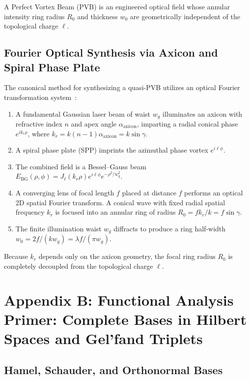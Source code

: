 \documentclass{optica-article}
\begin{document}
A Perfect Vortex Beam (PVB) is an engineered optical field whose annular intensity ring radius $R_0$ and thickness $w_0$ are geometrically independent of the topological charge $\ell$.

\subsection{Fourier Optical Synthesis via Axicon and Spiral Phase Plate}

The canonical method for synthesizing a quasi-PVB utilizes an optical Fourier transformation system~\cite{Vaity2015}:
\begin{enumerate}
    \item A fundamental Gaussian laser beam of waist $w_g$ illuminates an axicon with refractive index $n$ and apex angle $\alpha_{\text{axicon}}$, imparting a radial conical phase $e^{i k_r \rho}$, where $k_r = k (n-1) \alpha_{\text{axicon}} = k \sin \gamma$.
    \item A spiral phase plate (SPP) imprints the azimuthal phase vortex $e^{i \ell \phi}$.
    \item The combined field is a Bessel--Gauss beam $E_{\text{BG}}(\rho, \phi) = J_\ell(k_r \rho) e^{i \ell \phi} e^{-\rho^2 / w_g^2}$.
    \item A converging lens of focal length $f$ placed at distance $f$ performs an optical 2D spatial Fourier transform. A conical wave with fixed radial spatial frequency $k_r$ is focused into an annular ring of radius $R_0 = f k_r / k = f \sin \gamma$.
    \item The finite illumination waist $w_g$ diffracts to produce a ring half-width $w_0 = 2f / (k w_g) = \lambda f / (\pi w_g)$.
\end{enumerate}

Because $k_r$ depends only on the axicon geometry, the focal ring radius $R_0$ is completely decoupled from the topological charge $\ell$.

\section{Appendix B: Functional Analysis Primer: Complete Bases in Hilbert Spaces and Gel'fand Triplets}
\label{app:hilbert}

\subsection{Hamel, Schauder, and Orthonormal Bases}
\end{document}
